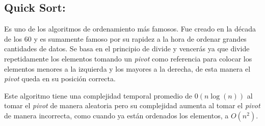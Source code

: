 \documentclass[12pt, a4paper]{article}
\begin{document}
            \subsection{Quick Sort:}
                Es uno de los algoritmos de ordenamiento más famosos. Fue creado en la década de los 60 y es sumamente famoso por su rapidez a la hora de ordenar grandes cantidades de datos. Se basa en el principio de divide y vencerás ya que divide repetidamente los elementos tomando un \textit{pivot} como referencia para colocar los elementos menores a la izquierda y los mayores a la derecha, de esta manera el \textit{pivot} queda en su posición correcta.
                
                Este algoritmo tiene una complejidad temporal promedio de $0(n\log(n))$ al tomar el \textit{pivot} de manera aleatoria pero su complejidad aumenta al tomar el \textit{pivot} de manera incorrecta, como  cuando ya están ordenados los elementos, a $O(n^2)$.
                
\end{document}
